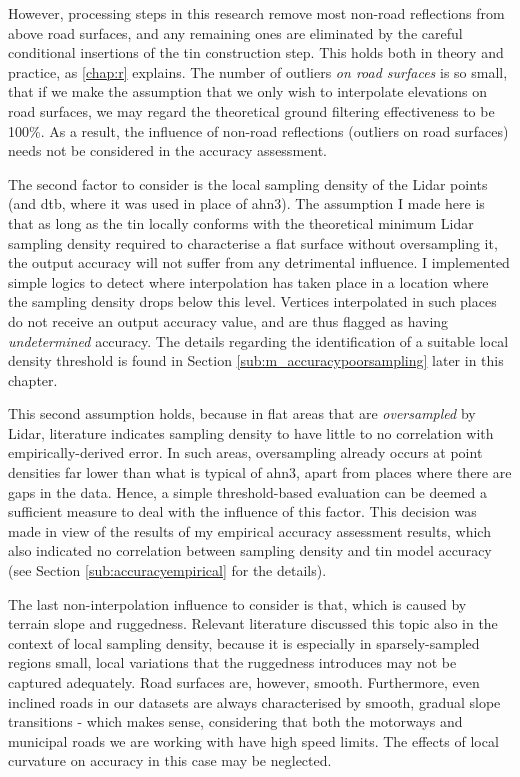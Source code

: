 However, processing steps in this research remove most non-road reflections from above road surfaces, and any remaining ones are eliminated by the careful conditional insertions of the \ac{tin} construction step. This holds both in theory and practice, as \ref{chap:r} explains. The number of outliers \textit{on road surfaces} is so small, that if we make the assumption that we only wish to interpolate elevations on road surfaces, we may regard the theoretical ground filtering effectiveness to be 100\%. As a result, the influence of non-road reflections (outliers on road surfaces) needs not be considered in the accuracy assessment.

The second factor to consider is the local sampling density of the Lidar points (and \ac{dtb}, where it was used in place of \ac{ahn3}). The assumption I made here is that as long as the \ac{tin} locally conforms with the theoretical minimum Lidar sampling density required to characterise a flat surface without oversampling it, the output accuracy will not suffer from any detrimental influence. I implemented simple logics to detect where interpolation has taken place in a location where the sampling density drops below this level. Vertices interpolated in such places do not receive an output accuracy value, and are thus flagged as having \textit{undetermined} accuracy. The details regarding the identification of a suitable local density threshold is found in Section \ref{sub:m_accuracypoorsampling} later in this chapter.

This second assumption holds, because in flat areas that are \textit{oversampled} by Lidar, literature indicates sampling density to have little to no correlation with empirically-derived error. In such areas, oversampling already occurs at point densities far lower than what is typical of \ac{ahn3}, apart from places where there are gaps in the data. Hence, a simple threshold-based evaluation can be deemed a sufficient measure to deal with the influence of this factor. This decision was made in view of the results of my empirical accuracy assessment results, which also indicated no correlation between sampling density and \ac{tin} model accuracy (see Section \ref{sub:accuracyempirical} for the details).

The last non-interpolation influence to consider is that, which is caused by terrain slope and ruggedness. Relevant literature discussed this topic also in the context of local sampling density, because it is especially in sparsely-sampled regions small, local variations that the ruggedness introduces may not be captured adequately. Road surfaces are, however, smooth. Furthermore, even inclined roads in our datasets are always characterised by smooth, gradual slope transitions - which makes sense, considering that both the motorways and municipal roads we are working with have high speed limits. The effects of local curvature on accuracy in this case may be neglected.

